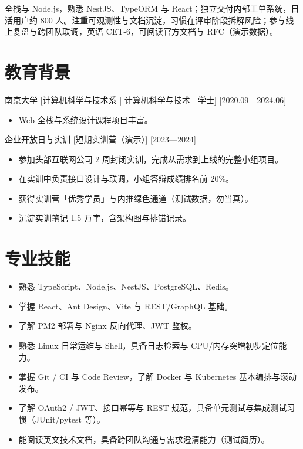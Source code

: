 \documentclass{resume-photo}
\begin{document}

\ResumeTitle

\noindent 全栈与 Node.js，熟悉 NestJS、TypeORM 与 React；独立交付内部工单系统，日活用户约 800 人。注重可观测性与文档沉淀，习惯在评审阶段拆解风险；参与线上复盘与跨团队联调，英语 CET-6，可阅读官方文档与 RFC（演示数据）。

\section{教育背景}
\ResumeItem
{南京大学}
[\textnormal{计算机科学与技术系 | 计算机科学与技术 | 学士}]
[2020.09—2024.06]

\begin{itemize}
  \item Web 全栈与系统设计课程项目丰富。
\end{itemize}


\ResumeItem
{企业开放日与实训}
[\textnormal{短期实训营（演示）}]
[2023—2024]

\begin{itemize}
  \item 参加头部互联网公司 2 周封闭实训，完成从需求到上线的完整小组项目。
  \item 在实训中负责接口设计与联调，小组答辩成绩排名前 20\%。
  \item 获得实训营「优秀学员」与内推绿色通道（测试数据，勿当真）。
  \item 沉淀实训笔记 1.5 万字，含架构图与排错记录。
\end{itemize}



\section{专业技能}
\begin{itemize}
  \item 熟悉 TypeScript、Node.js、NestJS、PostgreSQL、Redis。
  \item 掌握 React、Ant Design、Vite 与 REST/GraphQL 基础。
  \item 了解 PM2 部署与 Nginx 反向代理、JWT 鉴权。
  \item 熟悉 Linux 日常运维与 Shell，具备日志检索与 CPU/内存突增初步定位能力。
  \item 掌握 Git / CI 与 Code Review，了解 Docker 与 Kubernetes 基本编排与滚动发布。
  \item 了解 OAuth2 / JWT、接口幂等与 REST 规范，具备单元测试与集成测试习惯（JUnit/pytest 等）。
  \item 能阅读英文技术文档，具备跨团队沟通与需求澄清能力（测试简历）。
\end{itemize}
\end{document}
